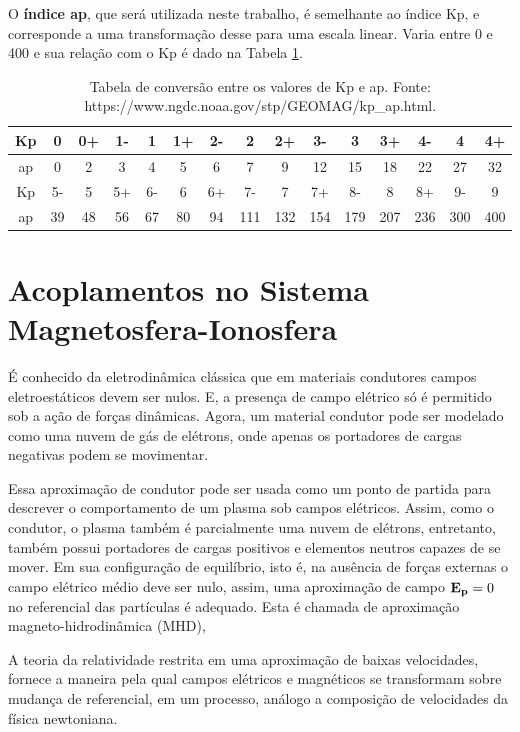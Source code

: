O {\bf índice ap}, que será utilizada neste trabalho, é semelhante ao índice Kp, e corresponde a uma transformação desse para uma escala linear. Varia entre 0 e 400 e sua relação com o Kp é dado na Tabela \ref{tab:kptoap}.

\begin{table}[hhh]
\begin{tabular}{|c|c|c|c|c|c|c|c|c|c|c|c|c|c|c|} \hline
Kp & 0  & 0+ & 1- & 1  & 1+ & 2- & 2   & 2+  & 3-  & 3   & 3+  & 4-  & 4   & 4+  \\ \hline
ap & 0  & 2  & 3  & 4  & 5  & 6  & 7   & 9   & 12  & 15  & 18  & 22  & 27  & 32  \\ \hline
Kp & 5- & 5  & 5+ & 6- & 6  & 6+ & 7-  & 7   & 7+  & 8-  & 8   & 8+  & 9-  & 9   \\ \hline
ap & 39 & 48 & 56 & 67 & 80 & 94 & 111 & 132 & 154 & 179 & 207 & 236 & 300 & 400 \\ \hline
\end{tabular}
\caption{Tabela de conversão entre os valores de Kp e ap. Fonte: https://www.ngdc.noaa.gov/stp/GEOMAG/kp\_ap.html.}
\label{tab:kptoap}
\end{table}

\section{Acoplamentos no Sistema Magnetosfera-Ionosfera}

É conhecido da eletrodinâmica clássica que em materiais condutores campos eletroestáticos devem ser nulos. E, a presença de campo elétrico só é permitido sob a ação de forças dinâmicas. Agora, um material condutor pode ser modelado como uma nuvem de gás de elétrons, onde apenas os portadores de cargas negativas podem se movimentar.

Essa aproximação de condutor pode ser usada como um ponto de partida para descrever o comportamento de um plasma sob campos elétricos. Assim, como o condutor, o plasma também é parcialmente uma nuvem de elétrons, entretanto, também possui portadores de cargas positivos e elementos neutros capazes de se mover. Em sua configuração de equilíbrio, isto é, na ausência de forças externas o campo elétrico médio deve ser nulo, assim, uma aproximação de campo ${\bf E_p}=0$ no referencial das partículas é adequado. Esta é chamada de aproximação magneto-hidrodinâmica (MHD), \cite{ROEDERER:1979} 

A teoria da relatividade restrita em uma aproximação de baixas velocidades, fornece a maneira pela qual campos elétricos e magnéticos se transformam sobre mudança de referencial, em um processo, análogo a composição de velocidades da física newtoniana.

